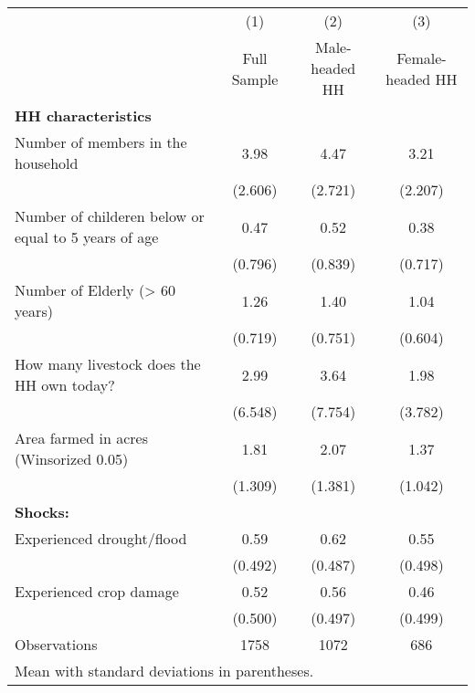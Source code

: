 {
\def\sym#1{\ifmmode^{#1}\else\(^{#1}\)\fi}
\begin{tabular}{l*{3}{c}}
\hline\hline
                    &\multicolumn{1}{c}{(1)}&\multicolumn{1}{c}{(2)}&\multicolumn{1}{c}{(3)}\\
                    &\multicolumn{1}{c}{Full Sample}&\multicolumn{1}{c}{ Male-headed HH}&\multicolumn{1}{c}{Female-headed HH}\\
\hline
\textbf{HH characteristics}&                     &                     &                     \\
[1em]
Number of members in the household&        3.98         &        4.47         &        3.21         \\
                    &     (2.606)         &     (2.721)         &     (2.207)         \\
[1em]
Number of childeren below or equal to 5 years of age&        0.47         &        0.52         &        0.38         \\
                    &     (0.796)         &     (0.839)         &     (0.717)         \\
[1em]
Number of Elderly (> 60 years)&        1.26         &        1.40         &        1.04         \\
                    &     (0.719)         &     (0.751)         &     (0.604)         \\
[1em]
How many livestock does the HH own today?&        2.99         &        3.64         &        1.98         \\
                    &     (6.548)         &     (7.754)         &     (3.782)         \\
[1em]
Area farmed in acres (Winsorized 0.05)&        1.81         &        2.07         &        1.37         \\
                    &     (1.309)         &     (1.381)         &     (1.042)         \\
[1em]
\textbf{Shocks:}    &                     &                     &                     \\
[1em]
Experienced drought/flood&        0.59         &        0.62         &        0.55         \\
                    &     (0.492)         &     (0.487)         &     (0.498)         \\
[1em]
Experienced crop damage&        0.52         &        0.56         &        0.46         \\
                    &     (0.500)         &     (0.497)         &     (0.499)         \\
\hline
Observations        &        1758         &        1072         &         686         \\
\hline\hline
\multicolumn{4}{l}{\footnotesize Mean with standard deviations in parentheses.}\\
\end{tabular}
}
